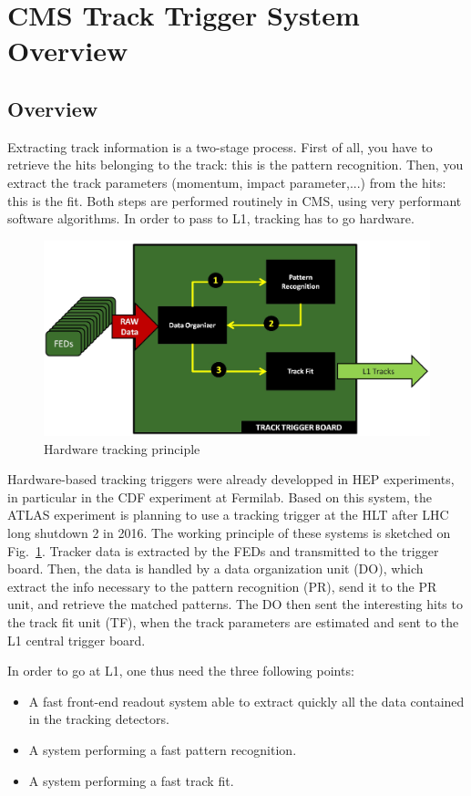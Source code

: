 \section{CMS Track Trigger System Overview}

\subsection{Overview}

\noindent Extracting track information is a two-stage process. First of all, you have to retrieve the hits belonging to the track: this is the pattern recognition. Then, you extract the track parameters (momentum, impact parameter,...) from the hits: this is the fit. Both steps are performed routinely in CMS, using very performant software algorithms. In order to pass to L1, tracking has to go hardware.

\begin{figure}[ht!]
\centering
\includegraphics[width=0.5\columnwidth]{Plots/L1TTrigPrinciple.eps}
\caption{Hardware tracking principle}
\label{fig:L1TT_principle}
\end{figure}

\noindent Hardware-based tracking triggers were already developped in HEP experiments, in particular in the CDF experiment at Fermilab. Based on this system, the ATLAS experiment is planning to use a tracking trigger at the HLT after LHC long shutdown 2 in 2016. The working principle of these systems is sketched on Fig.~\ref{fig:L1TT_principle}. Tracker data is extracted by the FEDs and transmitted to the trigger board. Then, the data is handled by a data organization unit (DO), which extract the info necessary to the pattern recognition (PR), send it to the PR unit, and retrieve the matched patterns. The DO then sent the interesting hits to the track fit unit (TF), when the track parameters are estimated and sent to the L1 central trigger board.

\noindent In order to go at L1, one thus need the three following points: 

\begin{itemize}
\item A fast front-end readout system able to extract quickly all the data contained in the tracking detectors.
\item A system performing a fast pattern recognition.
\item A system performing a fast track fit.
\end{itemize}

